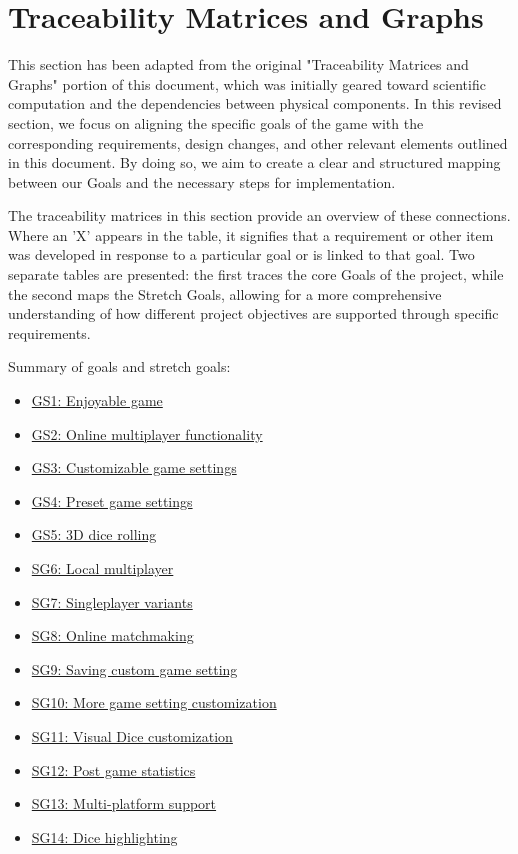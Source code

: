 \section{Traceability Matrices and Graphs}

This section has been adapted from the original "Traceability Matrices and Graphs" portion of this document, which was initially geared toward scientific computation and the dependencies between physical components. In this revised section, we focus on aligning the specific goals of the game with the corresponding requirements, design changes, and other relevant elements outlined in this document. By doing so, we aim to create a clear and structured mapping between our Goals and the necessary steps for implementation.

The traceability matrices in this section provide an overview of these connections. Where an 'X' appears in the table, it signifies that a requirement or other item was developed in response to a particular goal or is linked to that goal. Two separate tables are presented: the first traces the core Goals of the project, while the second maps the Stretch Goals, allowing for a more comprehensive understanding of how different project objectives are supported through specific requirements.\newline

Summary of goals and stretch goals:
\begin{itemize}
	\item \hyperref[G_enjoyable]{GS1: Enjoyable game}
	\item \hyperref[G_multiplayer]{GS2: Online multiplayer functionality}
	\item \hyperref[G_customization]{GS3: Customizable game settings}
	\item \hyperref[G_presets]{GS4: Preset game settings}
	\item \hyperref[G_3D]{GS5: 3D dice rolling}

	\item \hyperref[G_local_multiplayer]{SG6: Local multiplayer}
	\item \hyperref[G_singleplayer]{SG7: Singleplayer variants}
	\item \hyperref[G_matchmaking]{SG8: Online matchmaking}
	\item \hyperref[G_saving]{SG9: Saving custom game setting}
	\item \hyperref[G_customization2]{SG10: More game setting customization}
	\item \hyperref[G_skins]{SG11: Visual Dice customization}
	\item \hyperref[G_stats]{SG12: Post game statistics}
	\item \hyperref[G_platforms]{SG13: Multi-platform support}
	\item \hyperref[G_highlights]{SG14: Dice highlighting}
\end{itemize}

